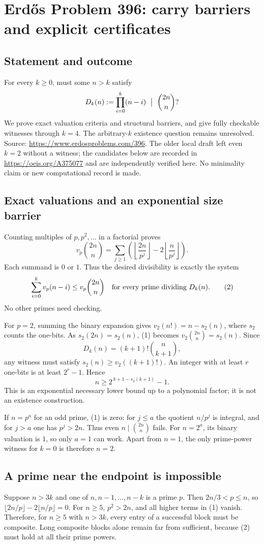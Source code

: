 \section*{Erd\H{o}s Problem 396: carry barriers and explicit certificates}
\subsection*{Statement and outcome}
For every $k\ge0$, must some $n>k$ satisfy
\[
 D_k(n):=\prod_{i=0}^k(n-i)\ \bigm|\ \binom{2n}{n}?
\]
We prove exact valuation criteria and structural barriers, and give fully checkable witnesses through $k=4$. The arbitrary-$k$ existence question remains unresolved. Source: \url{https://www.erdosproblems.com/396}. The older local draft left even $k=2$ without a witness; the candidates below are recorded in \url{https://oeis.org/A375077} and are independently verified here. No minimality claim or new computational record is made.

\subsection*{Exact valuations and an exponential size barrier}
Counting multiples of $p,p^2,\ldots$ in a factorial proves
\[
 v_p\binom{2n}{n}
 =\sum_{j\ge1}\left(\left\lfloor\frac{2n}{p^j}\right\rfloor
              -2\left\lfloor\frac n{p^j}\right\rfloor\right). \tag{1}
\]
Each summand is $0$ or $1$. Thus the desired divisibility is exactly the system
\[
 \sum_{i=0}^k v_p(n-i)\le v_p\binom{2n}{n}
 \quad\hbox{for every prime dividing }D_k(n). \tag{2}
\]
No other primes need checking.

For $p=2$, summing the binary expansion gives $v_2(n!)=n-s_2(n)$, where $s_2$ counts the one-bits. As $s_2(2n)=s_2(n)$, (1) becomes $v_2\binom{2n}{n}=s_2(n)$. Since
\[
 D_k(n)=(k+1)!\binom n{k+1},
\]
any witness must satisfy $s_2(n)\ge v_2((k+1)!)$. An integer with at least $r$ one-bits is at least $2^r-1$. Hence
\[
 n\ge2^{\,k+1-s_2(k+1)}-1. \tag{3}
\]
This is an exponential necessary lower bound up to a polynomial factor; it is not an existence construction.

If $n=p^a$ for an odd prime, (1) is zero: for $j\le a$ the quotient $n/p^j$ is integral, and for $j>a$ one has $p^j>2n$. Thus even $n\mid\binom{2n}{n}$ fails. For $n=2^a$, its binary valuation is $1$, so only $a=1$ can work. Apart from $n=1$, the only prime-power witness for $k=0$ is therefore $n=2$.

\subsection*{A prime near the endpoint is impossible}
Suppose $n>3k$ and one of $n,n-1,\ldots,n-k$ is a prime $p$. Then $2n/3<p\le n$, so $\lfloor2n/p\rfloor-2\lfloor n/p\rfloor=0$. For $n\ge5$, $p^2>2n$, and all higher terms in (1) vanish. Therefore, for $n\ge5$ with $n>3k$, every entry of a successful block must be composite. Long composite blocks alone remain far from sufficient, because (2) must hold at all their prime powers.


